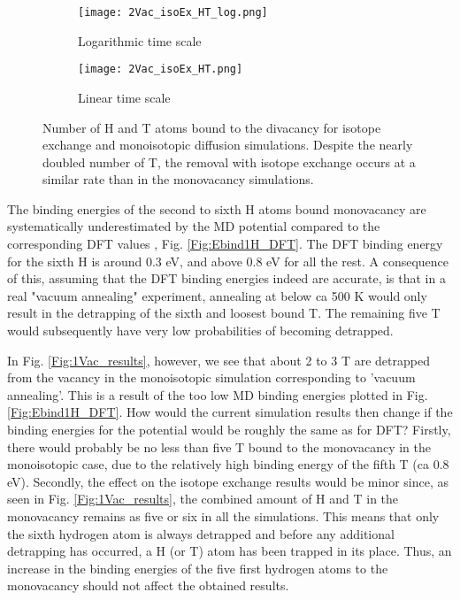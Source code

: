 \begin{figure}[!ht]
\begin{subfigure}{.5\textwidth}
  \centering
 \texttt{[image: 2Vac\_isoEx\_HT\_log.png]}  
  \caption{Logarithmic time scale}
\end{subfigure}
\begin{subfigure}{.5\textwidth}
  \centering
  \texttt{[image: 2Vac\_isoEx\_HT.png]}  
  \caption{Linear time scale}
\end{subfigure}
   \caption{Number of H and T atoms bound to the divacancy for isotope exchange and monoisotopic diffusion simulations. Despite the nearly doubled number of T, the removal with isotope exchange occurs at a similar rate than in the monovacancy simulations.}
   \label{Fig:2Vac_results} 
\end{figure}

The binding energies of the second to sixth H atoms bound monovacancy are systematically underestimated by the MD potential compared to the corresponding DFT values \cite{heinolaTungstenDFT}, Fig. \ref{Fig:Ebind1H_DFT}.
The DFT binding energy for the sixth H is around 0.3 eV, and above 0.8 eV for all the rest.
A consequence of this, assuming that the DFT binding energies indeed are accurate, is that in a real "vacuum annealing" experiment, annealing at below ca 500 K would only result in the detrapping of the sixth and loosest bound T.
The remaining five T would subsequently have very low probabilities of becoming detrapped.

In Fig. \ref{Fig:1Vac_results}, however, we see that about 2 to 3 T are detrapped from the vacancy in the monoisotopic simulation corresponding to 'vacuum annealing'.
This is a result of the too low MD binding energies plotted in Fig. \ref{Fig:Ebind1H_DFT}.
How would the current simulation results then change if the binding energies for the potential would be roughly the same as for DFT?
Firstly, there would probably be no less than five T bound to the monovacancy in the monoisotopic case, due to the relatively high binding energy of the fifth T (ca 0.8 eV).
Secondly, the effect on the isotope exchange results would be minor since, as seen in Fig. \ref{Fig:1Vac_results}, the combined amount of H and T in the monovacancy remains as five or six in all the simulations.
This means that only the sixth hydrogen atom is always detrapped and before any additional detrapping has occurred, a H (or T) atom has been trapped in its place.
Thus, an increase in the binding energies of the five first hydrogen atoms to the monovacancy should not affect the obtained results.

